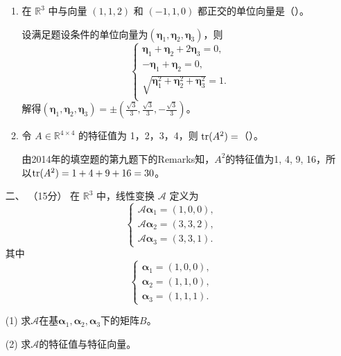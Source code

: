 \begin{enumerate}[1~]
\begin{enumerate}[1.~]
\item
在 $\mathbb{R}^3$ 中与向量 $(1, 1, 2)$ 和 $(−1, 1, 0)$ 都正交的单位向量是（\quad）。
\begin{solution}
设满足题设条件的单位向量为$(\boldsymbol{\eta}_1, \boldsymbol{\eta}_2, \boldsymbol{\eta}_3)$，则\[
\left\{ \begin{array}{l}
	\boldsymbol{\eta} _1+\boldsymbol{\eta} _2+2\boldsymbol{\eta} _3=0,\\
	-\boldsymbol{\eta} _1+\boldsymbol{\eta} _2=0,\\
	\sqrt{\boldsymbol{\eta}_1^2+\boldsymbol{\eta}_2^2+\boldsymbol{\eta}_3^2}=1.\\
\end{array} \right. 
\]
解得$(\boldsymbol{\eta}_1, \boldsymbol{\eta}_2, \boldsymbol{\eta}_3)=\pm(\frac{\sqrt{3}}{3}, \frac{\sqrt{3}}{3}, -\frac{\sqrt{3}}{3})$。
\end{solution}

\item
令 $A \in \mathbb { R } ^ { 4 \times 4 }$ 的特征值为 1，2，3，4，则 ${\rm tr}(A^2) =$（\quad）。

\begin{solution}
由2014年的填空题的第九题下的Remarks知，$A^2$的特征值为1, 4, 9, 16，所以${\rm tr}(A^2) =1+4+9+16=30$。
\end{solution}
\end{enumerate}

\item[二、]（15分）
在 $\mathbb{R}^3$ 中，线性变换 $\mathscr{A}$ 定义为
\[
\left\{ \begin{array} { l } { \mathscr { A } \boldsymbol{\alpha} _ { 1 } = ( 1,0,0 ) } ,\\ { \mathscr { A } \boldsymbol{\alpha} _ { 2 } = ( 3,3,2 ) } ,\\ { \mathscr { A } \boldsymbol{\alpha} _ { 3 } = ( 3,3,1 ) }. \end{array} \right.
\]
其中
\[
\left\{ \begin{array} { l } { \boldsymbol{\alpha} _ { 1 } = ( 1,0,0 ) }, \\ { \boldsymbol{\alpha} _ { 2 } = ( 1,1,0 ) }, \\ { \boldsymbol{\alpha} _ { 3 } = ( 1,1,1 ) }. \end{array} \right.
\]

(1) 求$\mathscr{A}$在基$\boldsymbol{\alpha}_1, \boldsymbol{\alpha}_2, \boldsymbol{\alpha}_3$下的矩阵$B$。

(2) 求$\mathscr{A}$的特征值与特征向量。


\end{enumerate}
